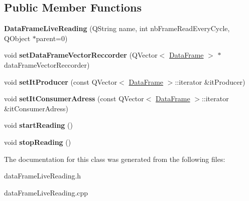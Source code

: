 \subsection*{Public Member Functions}
\begin{DoxyCompactItemize}
\item 
\mbox{\label{class_data_frame_live_reading_a664559fc3ce08383f1d2ee146768c6a1}} 
{\bfseries Data\+Frame\+Live\+Reading} (Q\+String name, int nb\+Frame\+Read\+Every\+Cycle, Q\+Object $\ast$parent=0)
\item 
\mbox{\label{class_data_frame_live_reading_aa7281e272524ebcdd7e213eec07d8e0f}} 
void {\bfseries set\+Data\+Frame\+Vector\+Reccorder} (Q\+Vector$<$ \hyperlink{class_data_frame}{Data\+Frame} $>$ $\ast$data\+Frame\+Vector\+Reccorder)
\item 
\mbox{\label{class_data_frame_live_reading_aba95df4ecd500fcc17122e1a45c3ac50}} 
void {\bfseries set\+It\+Producer} (const Q\+Vector$<$ \hyperlink{class_data_frame}{Data\+Frame} $>$\+::iterator \&it\+Producer)
\item 
\mbox{\label{class_data_frame_live_reading_ae0a30ff795ed51644fc04acc5133762e}} 
void {\bfseries set\+It\+Consumer\+Adress} (const Q\+Vector$<$ \hyperlink{class_data_frame}{Data\+Frame} $>$\+::iterator \&it\+Consumer\+Adress)
\item 
\mbox{\label{class_data_frame_live_reading_a5536ffbdbce5f234914ae58be7cbcb53}} 
void {\bfseries start\+Reading} ()
\item 
\mbox{\label{class_data_frame_live_reading_ad81c79f8783f7343a2450cbde6dc6d1f}} 
void {\bfseries stop\+Reading} ()
\end{DoxyCompactItemize}


The documentation for this class was generated from the following files\+:\begin{DoxyCompactItemize}
\item 
data\+Frame\+Live\+Reading.\+h\item 
data\+Frame\+Live\+Reading.\+cpp\end{DoxyCompactItemize}
